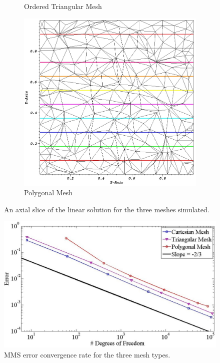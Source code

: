 \documentclass{anstrans}
\begin{document}
\begin{figure}[]
\begin{subfigure}{.5\textwidth}
	\caption{Ordered Triangular Mesh}
	\label{fig::poly_lin_sol}
\end{subfigure}
\begin{subfigure}{.5\textwidth}
	\centering
	\includegraphics[scale=0.28]{visit0007.jpg}
	\caption{Polygonal Mesh}
	\label{fig::poly_lin_sol}
\end{subfigure}
\caption{An axial slice of the linear solution for the three meshes simulated.}
\label{fig::lin_sols}
\end{figure}

\begin{figure}[]
\centering
\includegraphics[scale=0.30]{mms_err.jpg}
\caption{MMS error convergence rate for the three mesh types.}
\label{fig::mms_err}
\end{figure}
\end{document}
